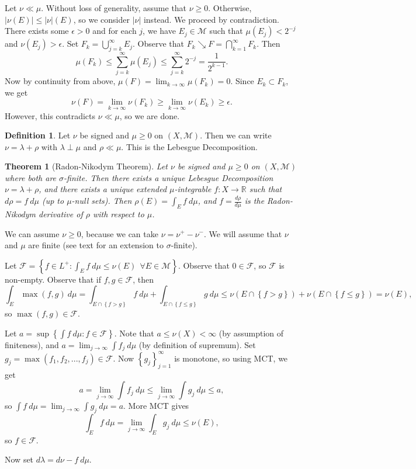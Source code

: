\documentclass[11pt]{article}
\newtheorem{thm}{Theorem}[section]
\theoremstyle{definition}
\newtheorem{defn}{Definition}[section]
\newcommand{\set}[1]{\left\{ #1 \right\}}
\newcommand{\abs}[1]{\left\lvert#1\right\rvert} %
\newcommand{\RR}{\mathbb{R}}
\newcommand{\m}[1]{\mathcal{#1}}
\begin{document}
Let $\nu\ll\mu$. Without loss of generality, assume that $\nu\ge0$. Otherwise,
$\abs{\nu(E)}\le\abs{\nu}(E)$, so we consider $\abs{\nu}$ instead. We proceed by
contradiction. There exists some $\epsilon>0$ and for each $j$, we have $E_j\in\m{M}$ such
that $\mu(E_j)<2^{-j}$ and $\nu(E_j)>\epsilon$. Set $F_k=\bigcup_{j=k}^\infty E_j$.
Observe that $F_k\searrow F = \bigcap_{k=1}^\infty F_k$. Then 
\[
  \mu(F_k) \le \sum_{j=k}^\infty\mu(E_j) \le \sum_{j=k}^\infty2^{-j} = \frac1{2^{k-1}} . 
\]
Now by continuity from above, $\mu(F)=\lim_{k\to\infty}\mu(F_k)=0$. Since $E_k\subset
F_k$, we get 
\[
  \nu(F) = \lim_{k\to\infty}\nu(F_k) \ge \lim_{k\to\infty}\nu(E_k) \ge \epsilon .
\]
However, this contradicts $\nu\ll\mu$, so we are done. 
\qedhere


\begin{defn}
  Let $\nu$ be signed and $\mu\ge0$ on $(X,\m{M})$. Then we can write $\nu=\lambda+\rho$
  with $\lambda\perp\mu$ and $\rho\ll\mu$. This is the Lebesgue Decomposition. 
\end{defn}

\begin{thm}[Radon-Nikodym Theorem]
  Let $\nu$ be signed and $\mu\ge0$ on $(X,\m{M})$ where both are $\sigma$-finite. Then
  there exists a unique Lebesgue Decomposition $\nu=\lambda+\rho$, and there exists a
  unique extended $\mu$-integrable $f:X\to\RR$ such that $d\rho=f~d\mu$ (up to $\mu$-null
  sets). Then $\rho(E)=\int_Ef~d\mu$, and $f=\frac{d\rho}{d\mu}$ is the Radon-Nikodym
  derivative of $\rho$ with respect to $\mu$. 
\end{thm}

\proof
We can assume $\nu\ge0$, because we can take $\nu=\nu^+-\nu^-$. 
We will assume that $\nu$ and $\mu$ are finite (see text for an extension to
$\sigma$-finite). 

Let $\m{F}=\set{f\in L^+ : \int_Ef~d\mu \le \nu(E) ~~\forall E\in\m{M}}$. Observe that
$0\in\m{F}$, so $\m{F}$ is non-empty. Observe that if $f,g\in\m{F}$, then 
\[
  \int_E\max(f,g)~d\mu = \int_{E\cap\set{f>g}}f~d\mu+\int_{E\cap\set{f\le g}}g~d\mu
  \le \nu(E\cap\set{f>g}) + \nu(E\cap\set{f\le g}) = \nu(E) ,
\]
so $\max(f,g)\in\m{F}$. 

Let $a=\sup\set{\int f~d\mu : f\in\m{F}}$. Note that $a\le\nu(X)<\infty$ (by assumption of
finiteness), and $a=\lim_{j\to\infty}\int f_j~d\mu$ (by definition of supremum). Set
$g_j=\max(f_1,f_2,...,f_j)\in\m{F}$. Now $\set{g_j}_{j=1}^\infty$ is monotone, so using
MCT, we get 
\[
  a = \lim_{j\to\infty}\int f_j~d\mu \le \lim_{j\to\infty}\int g_j~d\mu \le a ,
\]
so $\int f~d\mu = \lim_{j\to\infty}\int g_j~d\mu = a$. More MCT gives
\[
  \int_Ef~d\mu=\lim_{j\to\infty}\int_Eg_j~d\mu\le\nu(E) ,
\]
so $f\in\m{F}$.

Now set $d\lambda = d\nu - f~d\mu$. 


\qedhere



\end{document}
